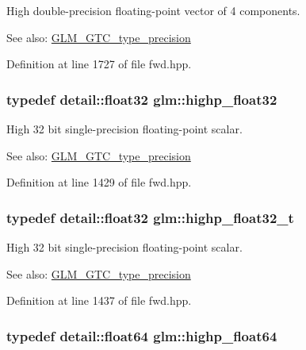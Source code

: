 High double-precision floating-point vector of 4 components. \begin{Desc}
\item[See also:]\hyperlink{group__gtc__type__precision}{GLM\_\-GTC\_\-type\_\-precision} \end{Desc}


Definition at line 1727 of file fwd.hpp.\hypertarget{group__gtc__type__precision_g91af7513c1102410646f2c435ca29be5}{
\subsubsection[highp\_\-float32]{\setlength{\rightskip}{0pt plus 5cm}typedef detail::float32 {\bf glm::highp\_\-float32}}}
\label{group__gtc__type__precision_g91af7513c1102410646f2c435ca29be5}


High 32 bit single-precision floating-point scalar. \begin{Desc}
\item[See also:]\hyperlink{group__gtc__type__precision}{GLM\_\-GTC\_\-type\_\-precision} \end{Desc}


Definition at line 1429 of file fwd.hpp.\hypertarget{group__gtc__type__precision_g4e16a7818d09e2da3b81765999f23928}{
\subsubsection[highp\_\-float32\_\-t]{\setlength{\rightskip}{0pt plus 5cm}typedef detail::float32 {\bf glm::highp\_\-float32\_\-t}}}
\label{group__gtc__type__precision_g4e16a7818d09e2da3b81765999f23928}


High 32 bit single-precision floating-point scalar. \begin{Desc}
\item[See also:]\hyperlink{group__gtc__type__precision}{GLM\_\-GTC\_\-type\_\-precision} \end{Desc}


Definition at line 1437 of file fwd.hpp.\hypertarget{group__gtc__type__precision_gb871a78c548d2fa53e1e8ec64a46eee7}{
\subsubsection[highp\_\-float64]{\setlength{\rightskip}{0pt plus 5cm}typedef detail::float64 {\bf glm::highp\_\-float64}}}
\label{group__gtc__type__precision_gb871a78c548d2fa53e1e8ec64a46eee7}


